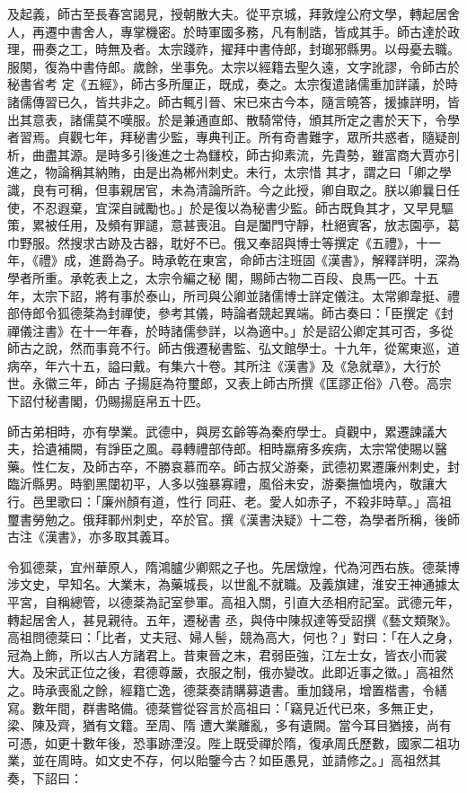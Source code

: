 \begin{pinyinscope}
 及起義，師古至長春宮謁見，授朝散大夫。從平京城，拜敦煌公府文學，轉起居舍人，再遷中書舍人，專掌機密。於時軍國多務，凡有制誥，皆成其手。師古達於政理，冊奏之工，時無及者。太宗踐祚，擢拜中書侍郎，封瑯邪縣男。以母憂去職。服闋，復為中書侍郎。歲餘，坐事免。太宗以經籍去聖久遠，文字訛謬，令師古於秘書省考
 定《五經》，師古多所厘正，既成，奏之。太宗復遣諸儒重加詳議，於時諸儒傳習已久，皆共非之。師古輒引晉、宋已來古今本，隨言曉答，援據詳明，皆出其意表，諸儒莫不嘆服。於是兼通直郎、散騎常侍，頒其所定之書於天下，令學者習焉。貞觀七年，拜秘書少監，專典刊正。所有奇書難字，眾所共惑者，隨疑剖析，曲盡其源。是時多引後進之士為讎校，師古抑素流，先貴勢，雖富商大賈亦引進之，物論稱其納賄，由是出為郴州刺史。未行，太宗惜
 其才，謂之曰「卿之學識，良有可稱，但事親居官，未為清論所許。今之此授，卿自取之。朕以卿曩日任使，不忍遐棄，宜深自誡勵也。」於是復以為秘書少監。師古既負其才，又早見驅策，累被任用，及頻有罪譴，意甚喪沮。自是闔門守靜，杜絕賓客，放志園亭，葛巾野服。然搜求古跡及古器，耽好不已。俄又奉詔與博士等撰定《五禮》，十一年，《禮》成，進爵為子。時承乾在東宮，命師古注班固《漢書》，解釋詳明，深為學者所重。承乾表上之，太宗令編之秘
 閣，賜師古物二百段、良馬一匹。十五年，太宗下詔，將有事於泰山，所司與公卿並諸儒博士詳定儀注。太常卿韋挺、禮部侍郎令狐德棻為封禪使，參考其儀，時論者競起異端。師古奏曰：「臣撰定《封禪儀注書》在十一年春，於時諸儒參詳，以為適中。」於是詔公卿定其可否，多從師古之說，然而事竟不行。師古俄遷秘書監、弘文館學士。十九年，從駕東巡，道病卒，年六十五，謚曰戴。有集六十卷。其所注《漢書》及《急就章》，大行於世。永徽三年，師古
 子揚庭為符璽郎，又表上師古所撰《匡謬正俗》八卷。高宗下詔付秘書閣，仍賜揚庭帛五十匹。



 師古弟相時，亦有學業。武德中，與房玄齡等為秦府學士。貞觀中，累遷諫議大夫，拾遺補闕，有諍臣之風。尋轉禮部侍郎。相時羸瘠多疾病，太宗常使賜以醫藥。性仁友，及師古卒，不勝哀慕而卒。師古叔父游秦，武德初累遷廉州刺史，封臨沂縣男。時劉黑闥初平，人多以強暴寡禮，風俗未安，游秦撫恤境內，敬讓大行。邑里歌曰：「廉州顏有道，性行
 同莊、老。愛人如赤子，不殺非時草。」高祖璽書勞勉之。俄拜鄆州刺史，卒於官。撰《漢書決疑》十二卷，為學者所稱，後師古注《漢書》，亦多取其義耳。



 令狐德棻，宜州華原人，隋鴻臚少卿熙之子也。先居燉煌，代為河西右族。德棻博涉文史，早知名。大業末，為藥城長，以世亂不就職。及義旗建，淮安王神通據太平宮，自稱總管，以德棻為記室參軍。高祖入關，引直大丞相府記室。武德元年，轉起居舍人，甚見親待。五年，遷秘書
 丞，與侍中陳叔達等受詔撰《藝文類聚》。高祖問德棻曰：「比者，丈夫冠、婦人髻，競為高大，何也？」對曰：「在人之身，冠為上飾，所以古人方諸君上。昔東晉之末，君弱臣強，江左士女，皆衣小而裳大。及宋武正位之後，君德尊嚴，衣服之制，俄亦變改。此即近事之徵。」高祖然之。時承喪亂之餘，經籍亡逸，德棻奏請購募遺書。重加錢帛，增置楷書，令繕寫。數年間，群書略備。德棻嘗從容言於高祖曰：「竊見近代已來，多無正史，梁、陳及齊，猶有文籍。至周、隋
 遭大業離亂，多有遺闕。當今耳目猶接，尚有可憑，如更十數年後，恐事跡湮沒。陛上既受禪於隋，復承周氏歷數，國家二祖功業，並在周時。如文史不存，何以貽鑒今古？如臣愚見，並請修之。」高祖然其奏，下詔曰：




\end{pinyinscope}
